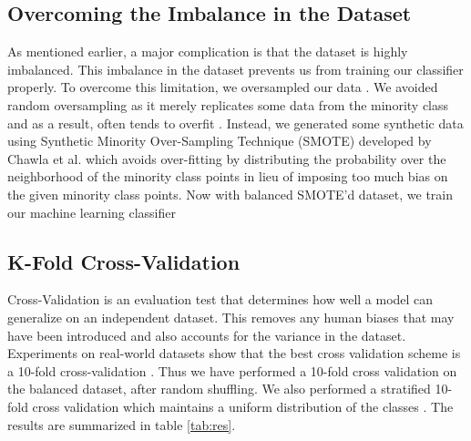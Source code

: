 \documentclass[12pt,a4paper]{article}
\begin{document}
\subsection{Overcoming the Imbalance in the Dataset}
\label{Overcoming the Imbalance in the Dataset}
 As mentioned earlier, a major complication is that the dataset is highly imbalanced. This imbalance in the dataset prevents us from training our classifier properly. To overcome this limitation, we oversampled our data \cite{he2009learning}. We avoided random oversampling as it merely replicates some data from the minority class and as a result, often tends to overfit \cite{mease2007boosted}. Instead, we generated some synthetic data using Synthetic Minority Over-Sampling Technique (SMOTE) developed by Chawla et al. \cite{chawla2002smote} which avoids over-fitting by distributing the probability over the neighborhood of the minority class points in lieu of imposing too much bias on the given minority class points. Now with balanced SMOTE’d dataset, we train our machine learning classifier

\subsection{K-Fold Cross-Validation}
 Cross-Validation is an evaluation test that determines how well a model can generalize on an independent dataset. This removes any human biases that may have been introduced and also accounts for the variance in the dataset. Experiments on real-world datasets show that the best cross validation scheme is a 10-fold cross-validation \cite{kohavi1995study}. Thus we have performed a 10-fold cross validation on the balanced dataset, after random shuffling. We also performed a stratified 10-fold cross validation which maintains a uniform distribution of the classes \cite{kohavi1995study}. The results are summarized in table \ref{tab:res}.

\end{document}
